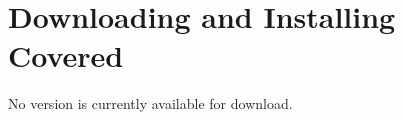 \section{Downloading and Installing Covered}\label{page_download}


No version is currently available for download.

